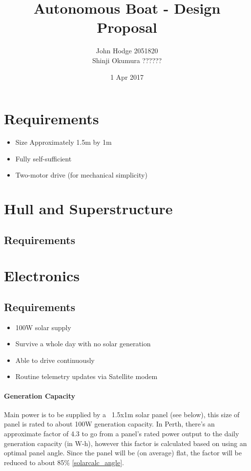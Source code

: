 
\title{Autonomous Boat - Design Proposal}
\author{John Hodge 2051820 \\ Shinji Okumura ??????}
\date{1 Apr 2017}

\maketitle

\section{Requirements}
\begin{itemize}
\item{Size} Approximately 1.5m by 1m
\item Fully self-sufficient
\item Two-motor drive (for mechanical simplicity)
\end{itemize}

%
%
\section{Hull and Superstructure}
\subsection{Requirements}


%
%
\section{Electronics}

\subsection{Requirements}

\begin{itemize}
\item 100W solar supply
\item Survive a whole day with no solar generation
\item Able to drive continuously
\item Routine telemetry updates via Satellite modem
\end{itemize}

\paragraph{Generation Capacity}
Main power is to be supplied by a ~1.5x1m solar panel (see below), this size of panel is rated to about 100W generation capacity. In Perth, there's an approximate factor of 4.3 to go from a panel's rated power output to the daily generation capacity (in W-h), however this factor is calculated based on using an optimal panel angle. Since the panel will be (on average) flat, the factor will be reduced to about 85\% \ref{solarcalc_angle}.

